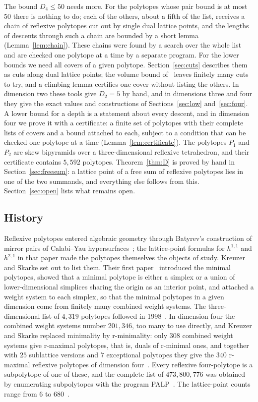 \documentclass[11pt]{amsart}
\theoremstyle{definition}
\theoremstyle{remark}
\newcommand{\UBs}{50}
\begin{document}
The bound $D_4\le\UBs$ needs more. For the polytopes whose pair bound is
at most $\UBs$ there is nothing to do; each of the others, about a fifth of
the list, receives a chain of reflexive polytopes cut out by single dual
lattice points, and the lengths of descents through such a chain are
bounded by a short lemma (Lemma~\ref{lem:chain}). These chains were found
by a search over the whole list and are checked one polytope at a time by
a separate program. For the lower bounds we need all covers of a given
polytope. Section~\ref{sec:cuts} describes them as cuts along dual lattice
points; the volume bound of~\cite{BKN22} leaves finitely many cuts to try,
and a climbing lemma certifies one cover without listing the others. In
dimension two these tools give $D_2=5$ by hand, and in dimensions three and
four they give the exact values and constructions of Sections~\ref{sec:low}
and~\ref{sec:four}. A lower bound for a depth is a statement about every
descent, and in dimension four we prove it with a certificate: a finite set
of polytopes with their complete lists of covers and a bound attached to
each, subject to a condition that can be checked one polytope at a time
(Lemma~\ref{lem:certificate}). The polytopes $P_1$ and $P_2$ are skew
bipyramids over a three-dimensional reflexive tetrahedron, and their
certificate contains $5{,}592$ polytopes. Theorem~\ref{thm:D} is proved by
hand in Section~\ref{sec:freesum}: a lattice point of a free sum of
reflexive polytopes lies in one of the two summands, and everything else
follows from this. Section~\ref{sec:open} lists what remains open.

\subsection*{History}

Reflexive polytopes entered algebraic geometry through Batyrev's
construction of mirror pairs of Calabi--Yau hypersurfaces~\cite{Bat94};
the lattice-point formulas for $h^{1,1}$ and $h^{2,1}$ in that paper made
the polytopes themselves the objects of study. Kreuzer and Skarke set out
to list them. Their first paper~\cite{KS97} introduced the minimal
polytopes, showed that a minimal polytope is either a simplex or a union of
lower-dimensional simplices sharing the origin as an interior point, and
attached a weight system to each simplex, so that the minimal polytopes in
a given dimension come from finitely many combined weight systems. The
three-dimensional list of $4{,}319$ polytopes followed in
1998~\cite{KS98}. In dimension four the combined weight systems number
$201{,}346$, too many to use directly, and Kreuzer and Skarke replaced
minimality by r-minimality: only $308$ combined weight systems give
r-maximal polytopes, that is, duals of r-minimal ones, and together with
$25$ sublattice versions and $7$ exceptional polytopes they give the $340$
r-maximal reflexive polytopes of dimension four~\cite{KS00}. Every
reflexive four-polytope is a subpolytope of one of these, and the complete
list of $473{,}800{,}776$ was obtained by enumerating subpolytopes with the
program PALP~\cite{KS04}. The lattice-point counts range from $6$ to
$680$~\cite{KS00}.
\end{document}
